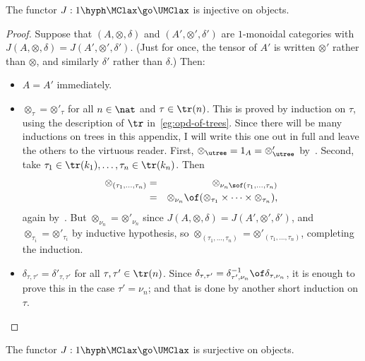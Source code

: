 \begin{lemma}	
The functor $J: 1\hyph\MClax \go \UMClax$ is injective on objects.
\end{lemma}

\begin{proof}
Suppose that $(A, \otimes, \delta)$ and $(A', \otimes', \delta')$ are
$1$-monoidal categories with $J(A, \otimes, \delta) = J(A', \otimes',
\delta')$.  (Just for once, the tensor of $A'$ is written $\otimes'$ rather
than $\otimes$, and similarly $\delta'$ rather than $\delta$.)  Then:
%
\begin{itemize}
\item $A = A'$ immediately.
\item $\otimes_\tau = \otimes'_\tau$ for all $n\in\nat$ and
$\tau\in\tr(n)$.  This is proved by induction on $\tau$, using the
description of $\tr$ in~\ref{eg:opd-of-trees}.  Since there will be many
inductions on trees in this appendix, I will write this one out in full and
leave the others to the virtuous reader.  First, $\otimes_\utree = 1_A =
\otimes'_\utree$ by~.  Second, take $\tau_1\in\tr(k_1), \ldots,
\tau_n\in\tr(k_n)$. Then
%
\begin{eqnarray*}
\otimes_{(\tau_1, \ldots, \tau_n)}	&=	&
\otimes_{\nu_n \sof (\tau_1, \ldots, \tau_n)}	\\
&=&\otimes_{\nu_n} \of (\otimes_{\tau_1} \times\cdots\times
\otimes_{\tau_n}),   
\end{eqnarray*}
%
again by~.  But $\otimes_{\nu_n} = \otimes'_{\nu_n}$ since
$J(A, \otimes, \delta) = J(A', \otimes', \delta')$, and $\otimes_{\tau_i} =
\otimes'_{\tau_i}$ by inductive hypothesis, so $\otimes_{(\tau_1, \ldots,
\tau_n)} = \otimes'_{(\tau_1, \ldots, \tau_n)}$, completing the induction.
\item $\delta_{\tau,\tau'} = \delta'_{\tau,\tau'}$ for all $\tau, \tau' \in
\tr(n)$.  Since $\delta_{\tau,\tau'} = \delta_{\tau',\nu_n}^{-1} \of
\delta_{\tau,\nu_n}$, it is enough to prove this in the case
$\tau'=\nu_n$; and that is done by another short induction on $\tau$.
\done
\end{itemize}
\end{proof}

\begin{lemma}
The functor $J: 1\hyph\MClax \go \UMClax$ is surjective on objects.
\end{lemma}

